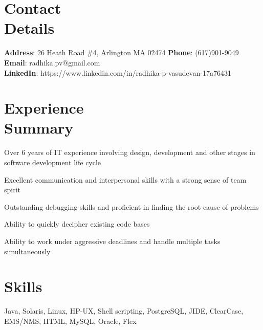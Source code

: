 \documentclass[margin]{resume}
\begin{document}
\begin{resume}

    \section{\mysidestyle Contact\\Details}

    \textbf{Address}: 26 Heath Road \#4, Arlington MA 02474  \hfill \textbf{Phone}: (617)901-9049  \\ \textbf{Email}: radhika.pv@gmail.com         \\
    \textbf{LinkedIn}: https://www.linkedin.com/in/radhika-p-vasudevan-17a76431\\

			\vspace{-5mm}
    \section{\mysidestyle Experience \\ Summary}
		\begin{list2}
    \item Over 6 years of IT experience involving design, development and other stages in software development life cycle
    \item Excellent communication and interpersonal skills with a strong sense of team spirit
    \item Outstanding debugging skills and proficient in finding the root cause of problems
    \item Ability to quickly decipher existing code bases
		\item Ability to work under aggressive deadlines and handle multiple tasks simultaneously
		\end{list2}

    \section{\mysidestyle Skills}
		Java, Solaris, Linux, HP-UX, Shell scripting, PostgreSQL, JIDE, ClearCase, EMS/NMS, HTML, MySQL, Oracle, Flex


\end{resume}
\end{document}
